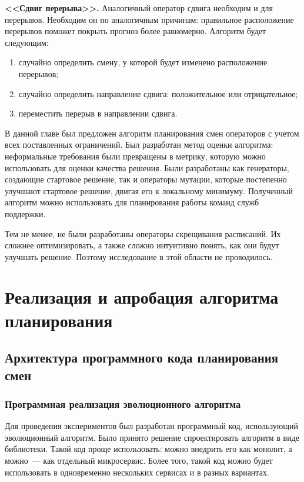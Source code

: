 \documentclass[times,specification,annotation]{itmo-student-thesis}
\begin{document}
\textbf{<<Сдвиг перерыва>>.}
Аналогичный оператор сдвига необходим и для перерывов.
Необходим он по аналогичным причинам: правильное расположение перерывов поможет покрыть прогноз более равномерно.
Алгоритм будет следующим:

\begin{enumerate}
    \item случайно определить смену, у которой будет изменено расположение перерывов;
    \item случайно определить направление сдвига: положительное или отрицательное;
    \item переместить перерыв в направлении сдвига.
\end{enumerate}

\chapterconclusion

В данной главе был предложен алгоритм планирования смен операторов с учетом всех поставленных ограничений.
Был разработан метод оценки алгоритма: неформальные требования были превращены в метрику, которую можно использовать для оценки качества решения.
Были разработаны как генераторы, создающие стартовое решение, так и операторы мутации, которые постепенно улучшают стартовое решение, двигая его к локальному минимуму.
Полученный алгоритм можно использовать для планирования работы команд служб поддержки.

Тем не менее, не были разработаны операторы скрещивания расписаний.
Их сложнее оптимизировать, а также сложно интуитивно понять, как они будут улучшать решение.
Поэтому исследование в этой области не проводилось.

\chapter{Реализация и апробация алгоритма планирования}

\section{Архитектура программного кода планирования смен}

\subsection{Программная реализация эволюционного алгоритма}

Для проведения экспериментов был разработан программный код, использующий эволюционный алгоритм.
Было принято решение спроектировать алгоритм в виде библиотеки.
Такой код проще использовать: можно внедрить его как монолит, а можно~--- как отдельный микросервис.
Более того, такой код можно будет использовать в одновременно нескольких сервисах и в разных вариантах.
\end{document}
